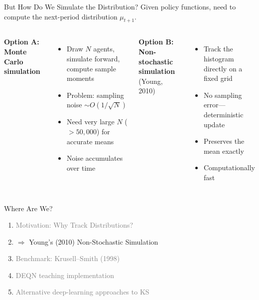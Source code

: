 \documentclass[aspectratio=169,11pt]{beamer}
\newcommand{\emphc}[1]{\textcolor{harvardcrimson}{#1}}
\begin{document}
\begin{frame}{But How Do We Simulate the Distribution?}
Given policy functions, need to compute the next-period distribution $\mu_{t+1}$.

\vspace{0.5em}
\begin{columns}[T]
\textbf{Option A: Monte Carlo simulation}
\begin{itemize}
    \item Draw $N$ agents, simulate forward, compute sample moments
    \item Problem: \emphc{sampling noise} $\sim O(1/\sqrt{N})$
    \item Need very large $N$ ($> 50{,}000$) for accurate means
    \item Noise accumulates over time
\end{itemize}

\textbf{Option B: Non-stochastic simulation}\\
{\small (Young, 2010)}
\begin{itemize}
    \item Track the \emphc{histogram} directly on a fixed grid
    \item \emphc{No sampling error}---deterministic update
    \item Preserves the mean \emphc{exactly}
    \item Computationally fast
\end{itemize}
\end{columns}

\vspace{0.5em}
\begin{center}
\end{center}
\end{frame}

\begin{frame}{Where Are We?}
\begin{enumerate}
    \item \textcolor{gray}{Motivation: Why Track Distributions?} \checkmark
    \vspace{0.25em}
    \item \emphc{$\Rightarrow$ Young's (2010) Non-Stochastic Simulation}
    \vspace{0.25em}
    \item \textcolor{gray}{Benchmark: Krusell--Smith (1998)}
    \vspace{0.25em}
    \item \textcolor{gray}{DEQN teaching implementation}
    \vspace{0.25em}
    \item \textcolor{gray}{Alternative deep-learning approaches to KS}
\end{enumerate}
\end{frame}
\end{document}
